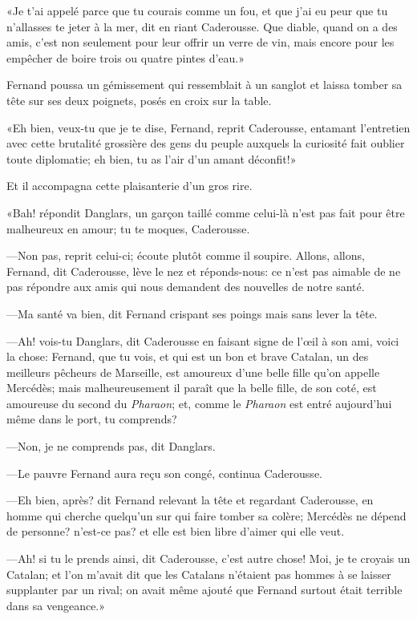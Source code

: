 «Je t'ai appelé parce que tu courais comme un fou, et que j'ai eu peur que tu n'allasses te jeter à la mer, dit en riant Caderousse. Que diable, quand on a des amis, c'est non seulement pour leur offrir un verre de vin, mais encore pour les empêcher de boire trois ou quatre pintes d'eau.»

Fernand poussa un gémissement qui ressemblait à un sanglot et laissa tomber sa tête sur ses deux poignets, posés en croix sur la table.

«Eh bien, veux-tu que je te dise, Fernand, reprit Caderousse, entamant l'entretien avec cette brutalité grossière des gens du peuple auxquels la curiosité fait oublier toute diplomatie; eh bien, tu as l'air d'un amant déconfit!»

Et il accompagna cette plaisanterie d'un gros rire.

«Bah! répondit Danglars, un garçon taillé comme celui-là n'est pas fait pour être malheureux en amour; tu te moques, Caderousse.

—Non pas, reprit celui-ci; écoute plutôt comme il soupire. Allons, allons, Fernand, dit Caderousse, lève le nez et réponds-nous: ce n'est pas aimable de ne pas répondre aux amis qui nous demandent des nouvelles de notre santé.

—Ma santé va bien, dit Fernand crispant ses poings mais sans lever la tête.

—Ah! vois-tu Danglars, dit Caderousse en faisant signe de l'œil à son ami, voici la chose: Fernand, que tu vois, et qui est un bon et brave Catalan, un des meilleurs pêcheurs de Marseille, est amoureux d'une belle fille qu'on appelle Mercédès; mais malheureusement il paraît que la belle fille, de son coté, est amoureuse du second du \textit{Pharaon}; et, comme le \textit{Pharaon} est entré aujourd'hui même dans le port, tu comprends?

—Non, je ne comprends pas, dit Danglars.

—Le pauvre Fernand aura reçu son congé, continua Caderousse.

—Eh bien, après? dit Fernand relevant la tête et regardant Caderousse, en homme qui cherche quelqu'un sur qui faire tomber sa colère; Mercédès ne dépend de personne? n'est-ce pas? et elle est bien libre d'aimer qui elle veut.

—Ah! si tu le prends ainsi, dit Caderousse, c'est autre chose! Moi, je te croyais un Catalan; et l'on m'avait dit que les Catalans n'étaient pas hommes à se laisser supplanter par un rival; on avait même ajouté que Fernand surtout était terrible dans sa vengeance.»

